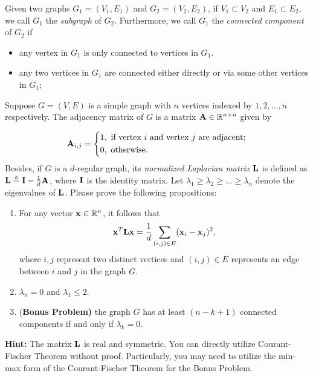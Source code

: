 \documentclass[english,onecolumn]{IEEEtran}
\newcommand{\Rbb}{\mathbb{R}}
\newcommand{\bA}{{\bf A}}
\newcommand{\bI}{{\bf I}}
\newcommand{\bL}{{\bf L}}
\newcommand{\bx}{{\bf x}}
\begin{document}
 Given two graphs $G_1=(V_1,E_1)$ and $G_2=(V_2,E_2)$, if $V_1\subset V_2$ and $E_1\subset E_2$, we call $G_1$ the \textit{subgraph} of $G_2$. 
Furthermore,  we call $G_1$ the \textit{connected component} of $G_2$ 
if 
\begin{itemize}
    \item 
	any vertex in $G_1$ is only connected to vertices in $G_1$.
	\item 
	any two vertices in $G_1$ are connected either directly or via some other vertices in $G_1$;
\end{itemize}
\vspace{3mm}
\noindent 
Suppose $G=(V,E)$ is a simple graph with $n$ vertices indexed by $1,2,...,n$ respectively. 
The adjacency matrix of $G$ is a matrix $\bA\in \Rbb^{n\times n}$ given by

\begin{equation}
\bA_{i,j}=\left\{
\begin{aligned}
1 &, \text{ if vertex } i \text{ and vertex } j \text{ are adjacent;}\\
0 &, \text{ otherwise.}
\end{aligned}
\right.
\end{equation}
Besides, if $G$ is a $d$-regular graph, its \textit{normalized Laplacian matrix} $\bL$ is defined as $\bL\triangleq \bI-\frac{1}{d}\bA$, where $\bI$ is the identity matrix. 
Let $\lambda_1\geq \lambda_2\geq...\geq \lambda_n$ denote the eigenvalues of $\bL$. 
Please prove the following propositions:
\begin{enumerate}
    \item For any vector $\bx \in \Rbb^n$, it follows that 
	\begin{equation}
	\label{C1+}
		\bx^T\bL\bx=\frac{1}{d}\sum_{(i,j)\in E}(\bx_i-\bx_j)^2,
	\end{equation} 
	where $i,j$ represent two distinct vertices and $(i,j)\in E$ represents an edge between $i$ and $j$ in the graph $G$.
	\item $\lambda_n=0$ and $\lambda_1\leq 2$.
	\item {\color{blue}(\textbf{Bonus Problem)}} the graph $G$ has at least $(n-k+1)$ connected components if and only if $\lambda_k=0$. 
\end{enumerate}



\noindent\textbf{Hint:} 
The matrix $\bL$ is real and symmetric. 
	You can directly utilize Courant-Fischer Theorem without proof. Particularly, you may need to utilize the min-max form of the Courant-Fischer Theorem for the Bonus Problem.
\end{document}
